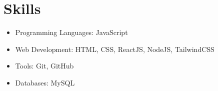 \section*{Skills}

\begin{itemize}
    \item Programming Languages: JavaScript
    \item Web Development: HTML, CSS, ReactJS, NodeJS, TailwindCSS
    \item Tools: Git, GitHub
    \item Databases: MySQL
\end{itemize}
